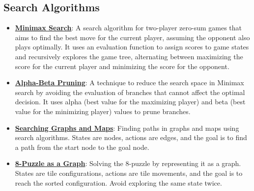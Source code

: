 \documentclass{article}%
\begin{document}
%
\subsection{Search Algorithms}%
\label{subsec:SearchAlgorithms}%
\begin{itemize}[leftmargin=*]%
\item \href{https://purdue.brightspace.com/d2l/common/assets/pdfjs-d2l-dist/1.0.14-legacy/web/viewer.html?file=\%2Fcontent\%2Fenforced\%2F1095467-wl.202510.CS.24300.001\%2F02L2-Intro.pdf\%3Fou\%3D1095467\&lang=en-us\&container=d2l-fileviewer-rendered-pdf\&fullscreen=d2l-fileviewer-rendered-pdf-dialog\&height=667#page=22}{\textbf{Minimax Search}}: A search algorithm for two-player zero-sum games that aims to find the best move for the current player, assuming the opponent also plays optimally. It uses an evaluation function to assign scores to game states and recursively explores the game tree, alternating between maximizing the score for the current player and minimizing the score for the opponent.%
\item \href{https://purdue.brightspace.com/d2l/common/assets/pdfjs-d2l-dist/1.0.14-legacy/web/viewer.html?file=\%2Fcontent\%2Fenforced\%2F1095467-wl.202510.CS.24300.001\%2F02L2-Intro.pdf\%3Fou\%3D1095467\&lang=en-us\&container=d2l-fileviewer-rendered-pdf\&fullscreen=d2l-fileviewer-rendered-pdf-dialog\&height=667#page=23}{\textbf{Alpha-Beta Pruning}}: A technique to reduce the search space in Minimax search by avoiding the evaluation of branches that cannot affect the optimal decision. It uses alpha (best value for the maximizing player) and beta (best value for the minimizing player) values to prune branches.%
\item \href{https://purdue.brightspace.com/d2l/common/assets/pdfjs-d2l-dist/1.0.14-legacy/web/viewer.html?file=\%2Fcontent\%2Fenforced\%2F1095467-wl.202510.CS.24300.001\%2F14L1-DepthFS.pdf\%3Fou\%3D1095467\&lang=en-us\&container=d2l-fileviewer-rendered-pdf\&fullscreen=d2l-fileviewer-rendered-pdf-dialog\&height=667#page=25}{\textbf{Searching Graphs and Maps}}: Finding paths in graphs and maps using search algorithms. States are nodes, actions are edges, and the goal is to find a path from the start node to the goal node.%
\item \href{https://purdue.brightspace.com/d2l/common/assets/pdfjs-d2l-dist/1.0.14-legacy/web/viewer.html?file=\%2Fcontent\%2Fenforced\%2F1095467-wl.202510.CS.24300.001\%2F14L1-DepthFS.pdf\%3Fou\%3D1095467\&lang=en-us\&container=d2l-fileviewer-rendered-pdf\&fullscreen=d2l-fileviewer-rendered-pdf-dialog\&height=667#page=29}{\textbf{8-Puzzle as a Graph}}: Solving the 8-puzzle by representing it as a graph. States are tile configurations, actions are tile movements, and the goal is to reach the sorted configuration. Avoid exploring the same state twice.%

\end{itemize}
\end{document}
